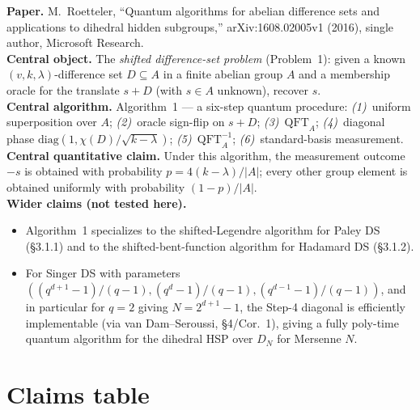 \documentclass[11pt]{article}
\begin{document}
\textbf{Paper.} M.~Roetteler, ``Quantum algorithms for abelian difference
sets and applications to dihedral hidden subgroups,'' arXiv:1608.02005v1
(2016), single author, Microsoft Research.  \\
\textbf{Central object.} The \emph{shifted difference-set problem}
(Problem~1): given a known $(v,k,\lambda)$-difference set
$D\subseteq A$ in a finite abelian group $A$ and a membership oracle for the
translate $s+D$ (with $s\in A$ unknown), recover $s$.  \\
\textbf{Central algorithm.} Algorithm~1 --- a six-step quantum procedure:
\emph{(1)}~uniform superposition over $A$; \emph{(2)}~oracle sign-flip on
$s+D$; \emph{(3)}~$\mathrm{QFT}_A$; \emph{(4)}~diagonal phase
$\mathrm{diag}(1,\chi(D)/\sqrt{k-\lambda})$; \emph{(5)}~$\mathrm{QFT}_A^{-1}$;
\emph{(6)}~standard-basis measurement.  \\
\textbf{Central quantitative claim.} Under this algorithm, the measurement
outcome $-s$ is obtained with probability $p = 4(k-\lambda)/|A|$; every
other group element is obtained uniformly with probability $(1-p)/|A|$.  \\
\textbf{Wider claims (not tested here).}
\begin{itemize}
\item Algorithm~1 specializes to the shifted-Legendre algorithm for Paley
      DS (\S3.1.1) and to the shifted-bent-function algorithm for Hadamard
      DS (\S3.1.2).
\item For Singer DS with parameters
      $((q^{d+1}-1)/(q-1), (q^d-1)/(q-1), (q^{d-1}-1)/(q-1))$, and in
      particular for $q=2$ giving $N = 2^{d+1}-1$, the Step-4 diagonal is
      efficiently implementable (via van Dam--Seroussi, \S4/Cor.~1), giving
      a fully poly-time quantum algorithm for the dihedral HSP over $D_N$
      for Mersenne $N$.
\end{itemize}

\section{Claims table}
\end{document}
